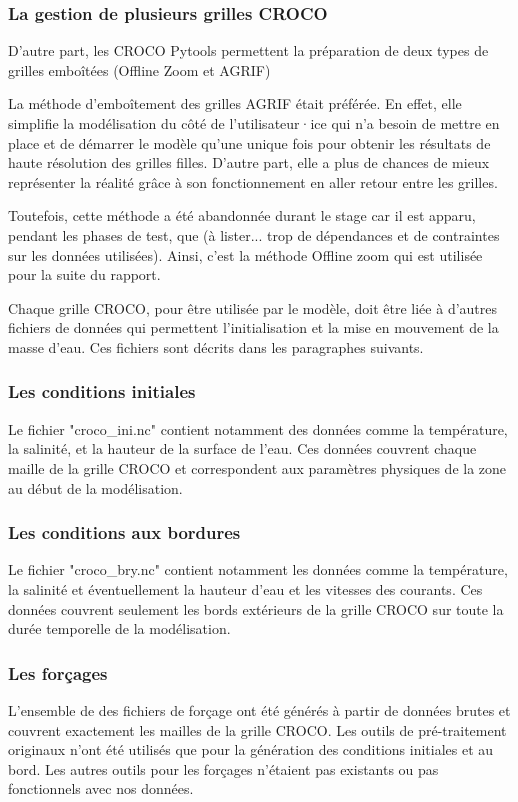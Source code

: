 \documentclass[10pt,a4paper,titlepage]{article}
\begin{document}
\subsubsection{La gestion de plusieurs grilles CROCO}
D'autre part, les CROCO Pytools permettent la préparation de deux types de grilles emboîtées (Offline Zoom et AGRIF)

La méthode d'emboîtement des grilles AGRIF était préférée.
En effet, elle simplifie la modélisation du côté de l'utilisateur·ice qui n'a besoin de mettre en place et de démarrer le modèle qu'une unique fois pour obtenir les résultats de haute résolution des grilles filles.
D'autre part, elle a plus de chances de mieux représenter la réalité grâce à son fonctionnement en aller retour entre les grilles.

Toutefois, cette méthode a été abandonnée durant le stage car il est apparu, pendant les phases de test, que
(à lister... trop de dépendances et de contraintes sur les données utilisées).
Ainsi, c'est la méthode Offline zoom qui est utilisée pour la suite du rapport.

Chaque grille CROCO, pour être utilisée par le modèle, doit être liée à d'autres fichiers de données qui permettent l'initialisation et la mise en mouvement de la masse d'eau. Ces fichiers sont décrits dans les paragraphes suivants.

\subsubsection{Les conditions initiales}
Le fichier "croco\_ini.nc" contient notamment des données comme la température, la salinité, et la hauteur de la surface de l'eau. Ces données couvrent chaque maille de la grille CROCO et correspondent aux paramètres physiques de la zone au début de la modélisation.

\subsubsection{Les conditions aux bordures}
Le fichier "croco\_bry.nc" contient notamment les données comme la température, la salinité et éventuellement la hauteur d'eau et les vitesses des courants. Ces données couvrent seulement les bords extérieurs de la grille CROCO sur toute la durée temporelle de la modélisation.

\subsubsection{Les forçages}
L'ensemble de des fichiers de forçage ont été générés à partir de données brutes et couvrent exactement les mailles de la grille CROCO.
Les outils de pré-traitement originaux n'ont été utilisés que pour la génération des conditions initiales et au bord.
Les autres outils pour les forçages n'étaient pas existants ou pas fonctionnels avec nos données.
\end{document}

